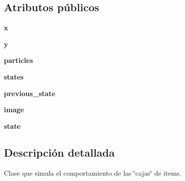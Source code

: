 \subsection*{\-Atributos públicos}
\begin{DoxyCompactItemize}
\item 
\hypertarget{classengine_1_1itembox_1_1ItemBox_a909065bd7223586cadf20234fc307ff8}{
{\bfseries x}}
\label{classengine_1_1itembox_1_1ItemBox_a909065bd7223586cadf20234fc307ff8}

\item 
\hypertarget{classengine_1_1itembox_1_1ItemBox_afa0eb7acfccf81b2015c4d8f990dcb4a}{
{\bfseries y}}
\label{classengine_1_1itembox_1_1ItemBox_afa0eb7acfccf81b2015c4d8f990dcb4a}

\item 
\hypertarget{classengine_1_1itembox_1_1ItemBox_a2089b24443b09381ef75166ef344a619}{
{\bfseries particles}}
\label{classengine_1_1itembox_1_1ItemBox_a2089b24443b09381ef75166ef344a619}

\item 
\hypertarget{classengine_1_1itembox_1_1ItemBox_a7d3e37e4a2aaae936a617e089f701300}{
{\bfseries states}}
\label{classengine_1_1itembox_1_1ItemBox_a7d3e37e4a2aaae936a617e089f701300}

\item 
\hypertarget{classengine_1_1itembox_1_1ItemBox_ab53de5b5ec83fd6b06a1c0f3e2143446}{
{\bfseries previous\-\_\-state}}
\label{classengine_1_1itembox_1_1ItemBox_ab53de5b5ec83fd6b06a1c0f3e2143446}

\item 
\hypertarget{classengine_1_1itembox_1_1ItemBox_ac0faa5be2536a634b865f6d0c57ee5b3}{
{\bfseries image}}
\label{classengine_1_1itembox_1_1ItemBox_ac0faa5be2536a634b865f6d0c57ee5b3}

\item 
\hypertarget{classengine_1_1itembox_1_1ItemBox_a447c3998da4c121bd023514f04e812da}{
{\bfseries state}}
\label{classengine_1_1itembox_1_1ItemBox_a447c3998da4c121bd023514f04e812da}

\end{DoxyCompactItemize}


\subsection{\-Descripción detallada}
\-Clase que simula el comportamiento de las \char`\"{}cajas\char`\"{} de items. 

